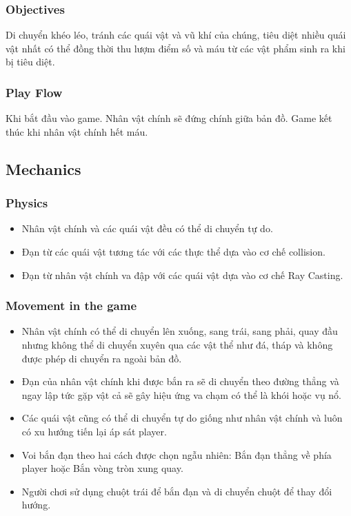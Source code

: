 \documentclass[../report.tex]{subfiles}
\begin{document}
\subsubsection{Objectives}
Di chuyển khéo léo, tránh các quái vật và vũ khí
của chúng, tiêu diệt nhiều quái vật nhất có thể
đồng thời thu lượm điểm số và máu từ các
vật phẩm sinh ra khi bị tiêu diệt. 

\subsubsection{Play Flow}
Khi bắt đầu vào game. Nhân vật chính sẽ đứng
chính giữa bản đồ. Game kết thúc khi nhân vật chính hết máu.

\subsection{Mechanics}
\subsubsection{Physics}
\begin{itemize}
\item Nhân vật chính và các quái
    vật đều có thể di chuyển tự do. 
\item Đạn từ các quái vật tương tác
    với các thực thể dựa vào cơ chế collision. 
\item Đạn từ nhân vật chính va đập với các quái
    vật dựa vào cơ chế Ray Casting. 
\end{itemize}

\subsubsection{Movement in the game}
\begin{itemize}
\item Nhân vật chính có thể di chuyển lên xuống, sang trái,
    sang phải, quay đầu nhưng không thể di chuyển xuyên
    qua các vật thể như đá, tháp và không
    được phép di chuyển ra ngoài bản đồ. 
\item Đạn của nhân vật chính khi được bắn ra sẽ di chuyển
    theo đường thẳng và ngay lập tức gặp vật cả
    sẽ gây hiệu ứng va chạm có thể là khói hoặc vụ nổ. 
\item Các quái vật cũng có thể di chuyển tự do giống
    như nhân vật chính và luôn có xu hướng tiến lại áp sát player.
\item Voi bắn đạn theo hai cách được chọn ngẫu nhiên:
    Bắn đạn thẳng về phía player hoặc Bắn vòng tròn xung quay. 
\item Người chơi sử dụng chuột trái để bắn đạn và 
    di chuyển chuột để thay đổi hướng. 
\end{itemize}
\end{document}
